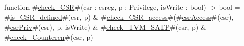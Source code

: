 function #\hyperref[sailRISCVzcheckzyCSR]{check\_CSR}#(csr : csreg, p : Privilege, isWrite : bool) -> bool =
    #\hyperref[sailRISCVziszyCSRzydefined]{is\_CSR\_defined}#(csr, p)
  & #\hyperref[sailRISCVzcheckzyCSRzyaccess]{check\_CSR\_access}#(#\hyperref[sailRISCVzcsrAccess]{csrAccess}#(csr), #\hyperref[sailRISCVzcsrPriv]{csrPriv}#(csr), p, isWrite)
  & #\hyperref[sailRISCVzcheckzyTVMzySATP]{check\_TVM\_SATP}#(csr, p)
  & #\hyperref[sailRISCVzcheckzyCounteren]{check\_Counteren}#(csr, p)
